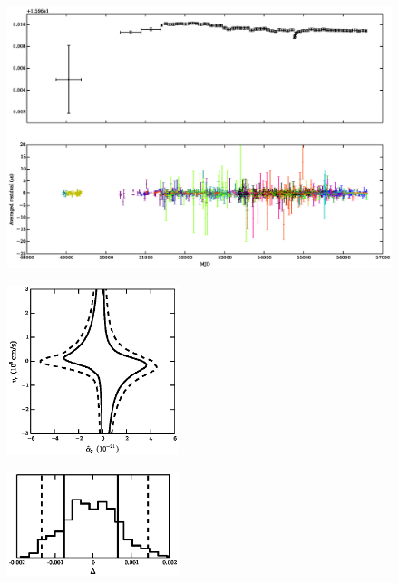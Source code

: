 \documentclass[10pt,preprint]{aastex}
\begin{document}



\begin{figure}
    \includegraphics[width=14cm]{1713_dmxres.eps} \\ 
\end{figure} 


\begin{figure}
    \includegraphics[width=5cm]{1713_alpha3.ps} \\ 
\end{figure} 


\begin{figure}
    \includegraphics[width=5cm]{1713_delta.ps} \\ 
\end{figure} 
\end{document}
